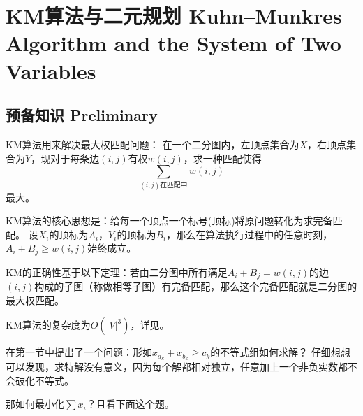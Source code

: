 \section{KM算法与二元规划 Kuhn–Munkres Algorithm and the System of Two Variables}
\subsection{预备知识 Preliminary}
KM算法用来解决最大权匹配问题： 在一个二分图内，左顶点集合为$X$，右顶点集合为$Y$，现对于每条边$(i, j)$有权$w(i,j)$，求一种匹配使得
\begin{displaymath}
\sum_{
	\text{$(i,j)$在匹配中}
	} w(i,j)
\end{displaymath}
最大。

\par KM算法的核心思想是：给每一个顶点一个标号(顶标)将原问题转化为求完备匹配。
设$X_i$的顶标为$A_i$，$Y_i$的顶标为$B_i$，那么在算法执行过程中的任意时刻，$A_i + B_j \ge w(i,j)$始终成立。
\par KM的正确性基于以下定理：若由二分图中所有满足$A_i + B_j = w(i,j)$的边$(i,j)$构成的子图（称做相等子图）有完备匹配，那么这个完备匹配就是二分图的最大权匹配。
\par KM算法的复杂度为$O(|V|^3)$，详见\cite{km}。

\vspace{14pt}
\par 在第一节中提出了一个问题：形如$x_{a_k} + x_{b_k} \ge c_k$的不等式组如何求解？
仔细想想可以发现，求特解没有意义，因为每个解都相对独立，任意加上一个非负实数都不会破化不等式。\par
那如何最小化$\sum{x_i}$？且看下面这个题。


